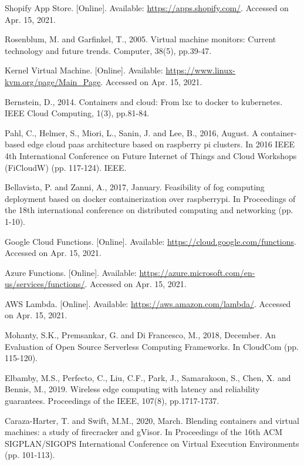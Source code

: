 \begin{thebibliography}{00}
 Shopify App Store. [Online]. Available: \url{https://apps.shopify.com/}. Accessed on Apr. 15, 2021.

 Rosenblum, M. and Garfinkel, T., 2005. Virtual machine monitors: Current technology and future trends. Computer, 38(5), pp.39-47.

 Kernel Virtual Machine. [Online]. Available: \url{https://www.linux-kvm.org/page/Main_Page}. Accessed on Apr. 15, 2021.

 Bernstein, D., 2014. Containers and cloud: From lxc to docker to kubernetes. IEEE Cloud Computing, 1(3), pp.81-84.

 Pahl, C., Helmer, S., Miori, L., Sanin, J. and Lee, B., 2016, August. A container-based edge cloud paas architecture based on raspberry pi clusters. In 2016 IEEE 4th International Conference on Future Internet of Things and Cloud Workshops (FiCloudW) (pp. 117-124). IEEE.

 Bellavista, P. and Zanni, A., 2017, January. Feasibility of fog computing deployment based on docker containerization over raspberrypi. In Proceedings of the 18th international conference on distributed computing and networking (pp. 1-10).

 Google Cloud Functions. [Online]. Available: \url{https://cloud.google.com/functions}. Accessed on Apr. 15, 2021.

 Azure Functions. [Online]. Available: \url{https://azure.microsoft.com/en-us/services/functions/}. Accessed on Apr. 15, 2021.

 AWS Lambda. [Online]. Available: \url{https://aws.amazon.com/lambda/}. Accessed on Apr. 15, 2021.

 Mohanty, S.K., Premsankar, G. and Di Francesco, M., 2018, December. An Evaluation of Open Source Serverless Computing Frameworks. In CloudCom (pp. 115-120).

 Elbamby, M.S., Perfecto, C., Liu, C.F., Park, J., Samarakoon, S., Chen, X. and Bennis, M., 2019. Wireless edge computing with latency and reliability guarantees. Proceedings of the IEEE, 107(8), pp.1717-1737.

 Caraza-Harter, T. and Swift, M.M., 2020, March. Blending containers and virtual machines: a study of firecracker and gVisor. In Proceedings of the 16th ACM SIGPLAN/SIGOPS International Conference on Virtual Execution Environments (pp. 101-113).


\end{thebibliography}
